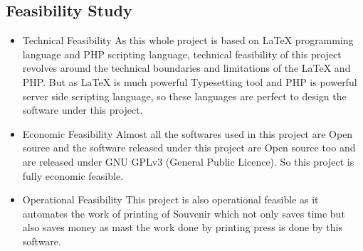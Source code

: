 \subsection{Feasibility Study}
\begin{itemize}
\item Technical Feasibility As this whole project is based on \LaTeX{} programming language and PHP scripting language, technical feasibility of this project revolves around the
technical boundaries and limitations of the \LaTeX{} and PHP. But as \LaTeX{} is much powerful Typesetting tool and PHP is powerful server side scripting language, so
these languages are perfect to design the software under this project.\\
\item Economic Feasibility Almost all the softwares used in this project are Open source and the software released under this project are Open source too and are released under GNU GPLv3 (General Public Licence). So this project is fully economic feasible.\\
\item Operational Feasibility This project is also operational feasible as it automates the work of printing of Souvenir which not only saves time but also saves money as mast the work done by printing press is done by this software.
\end{itemize}

